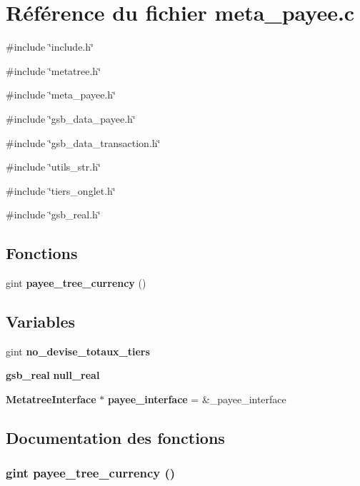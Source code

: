 \section{Référence du fichier meta\_\-payee.c}
\label{meta__payee_8c}
{\ttfamily \#include \char`\"{}include.h\char`\"{}}\par
{\ttfamily \#include \char`\"{}metatree.h\char`\"{}}\par
{\ttfamily \#include \char`\"{}meta\_\-payee.h\char`\"{}}\par
{\ttfamily \#include \char`\"{}gsb\_\-data\_\-payee.h\char`\"{}}\par
{\ttfamily \#include \char`\"{}gsb\_\-data\_\-transaction.h\char`\"{}}\par
{\ttfamily \#include \char`\"{}utils\_\-str.h\char`\"{}}\par
{\ttfamily \#include \char`\"{}tiers\_\-onglet.h\char`\"{}}\par
{\ttfamily \#include \char`\"{}gsb\_\-real.h\char`\"{}}\par
\subsection*{Fonctions}
\begin{DoxyCompactItemize}
\item 
gint {\bf payee\_\-tree\_\-currency} ()
\end{DoxyCompactItemize}
\subsection*{Variables}
\begin{DoxyCompactItemize}
\item 
gint {\bf no\_\-devise\_\-totaux\_\-tiers}
\item 
{\bf gsb\_\-real} {\bf null\_\-real}
\item 
{\bf MetatreeInterface} $\ast$ {\bf payee\_\-interface} = \&\_\-payee\_\-interface
\end{DoxyCompactItemize}


\subsection{Documentation des fonctions}
\subsubsection[{payee\_\-tree\_\-currency}]{\setlength{\rightskip}{0pt plus 5cm}gint payee\_\-tree\_\-currency ()}\label{meta__payee_8c_a13137d55a50bdd16328232e84af26b44}


